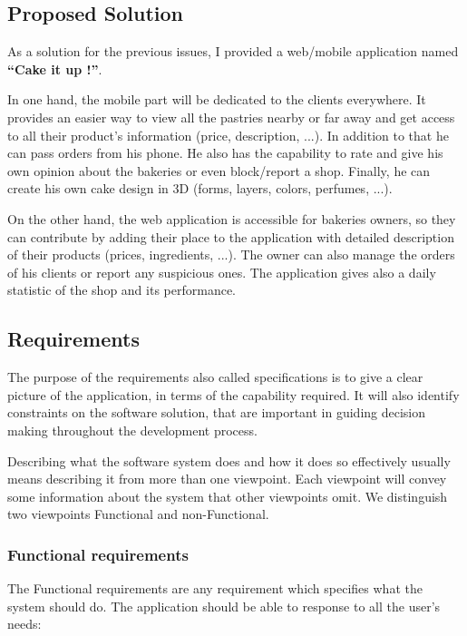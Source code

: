 \documentclass[12pt,a4paper]{report}
\begin{document}
	\subsection{Proposed Solution}
	As a solution for the previous issues, I provided a web/mobile application named \textbf{``Cake it up !''}.\par
	In one hand, the mobile part will be dedicated to the clients everywhere. It provides an easier way to view all the pastries nearby or far away and get access to all their product's information (price, description, ...). In addition to that he can pass orders from his phone. He also has the capability to rate and give his own opinion about the bakeries or even block/report a shop. Finally, he can create his own cake design in 3D (forms, layers, colors, perfumes, ...). \par
	On the other hand, the web application is accessible for bakeries owners, so they can contribute by adding their place to the application with detailed description of their products (prices, ingredients, ...). The owner can also manage the orders of his clients or report any suspicious ones. The application gives also a daily statistic of the shop and its performance.
	
	\subsection{Requirements}
	The purpose of the requirements also called specifications is to give a clear picture of the application, in terms of the capability required. It will also identify constraints on the software solution, that are important in guiding decision making throughout the development process.
	\par
	Describing what the software system does and how it does so	effectively usually means describing it from more than one viewpoint. Each viewpoint will
	convey some information about the system that other viewpoints omit. We distinguish  two viewpoints Functional and non-Functional.
	\clearpage
	\subsubsection{Functional requirements}
	The Functional requirements are any requirement which specifies what the system should do.
	The application should be able to response to all the user’s needs:
	
\end{document}

